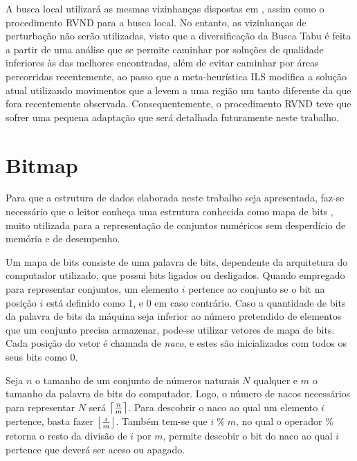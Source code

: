 \par A busca local utilizará as mesmas vizinhanças dispostas em \citep{art:REF_ART_1}, assim como o procedimento RVND para a busca local. No entanto, as vizinhanças de perturbação não serão utilizadas, visto que a diversificação da Busca Tabu é feita a partir de uma análise que se permite caminhar por soluções de qualidade inferiores às das melhores encontradas, além de evitar caminhar por áreas percorridas recentemente, ao passo que a meta-heurística ILS modifica a solução atual utilizando movimentos que a levem a uma região um tanto diferente da que fora recentemente observada. Consequentemente, o procedimento RVND teve que sofrer uma pequena adaptação que será detalhada futuramente neste trabalho.

\section{Bitmap}\label{sec:LABEL_CHP_6_SEC_B}

\par Para que a estrutura de dados elaborada neste trabalho seja apresentada, faz-se necessário que o leitor conheça uma estrutura conhecida como mapa de bits \citep{correa}, muito utilizada para a representação de conjuntos numéricos sem desperdício de memória e de desempenho. 

\par Um mapa de bits consiste de uma palavra de bits, dependente da arquitetura do computador utilizado, que possui bits ligados ou desligados. Quando empregado para representar conjuntos, um elemento $i$ pertence ao conjunto se o bit na posição $i$ está definido como 1, e 0 em caso contrário. Caso a quantidade de bits da palavra de bits da máquina seja inferior ao número pretendido de elementos que um conjunto precisa armazenar, pode-se utilizar vetores de mapa de bits. Cada posição do vetor é chamada de \textit{naco}, e estes são inicializados com todos os seus bits como $0$.

\par Seja $n$ o tamanho de um conjunto de números naturais $N$ qualquer e $m$ o tamanho da palavra de bits do computador. Logo, o número de nacos necessários para representar $N$ será $\ceil*{\frac{n}{m}}$. Para descobrir o naco ao qual um elemento $i$ pertence, basta fazer $\floor*{\frac{i}{m}}$. Também tem-se que $i \;\%\; m$, no qual o operador $\%$ retorna o resto da divisão de $i$ por $m$, permite descobir o bit do naco ao qual $i$ pertence que deverá ser aceso ou apagado.

